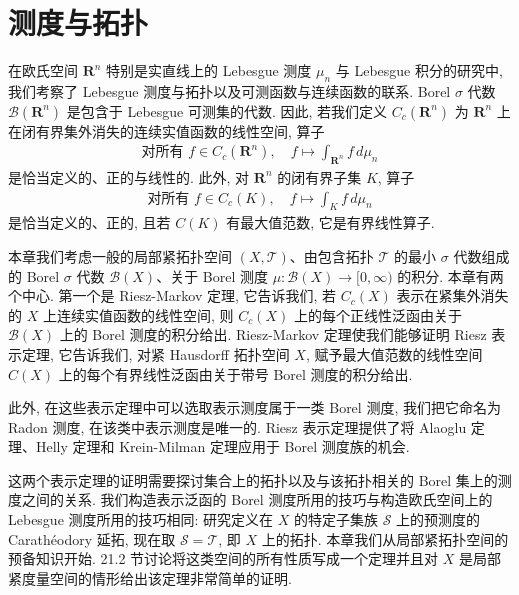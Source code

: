 \documentclass[../main.tex]{subfiles}
\begin{document}
\chapter{测度与拓扑}\label{chapter:ch21-测度与拓扑}

在欧氏空间 $\mathbf{R}^{n}$ 特别是实直线上的 Lebesgue 测度 $\mu_{n}$ 与 Lebesgue 积分的研究中, 我们考察了 Lebesgue 测度与拓扑以及可测函数与连续函数的联系. Borel $\sigma$ 代数 $\mathcal{B}(\mathbf{R}^{n})$ 是包含于 Lebesgue 可测集的代数. 因此, 若我们定义 $C_{c}(\mathbf{R}^{n})$ 为 $\mathbf{R}^{n}$ 上在闭有界集外消失的连续实值函数的线性空间, 算子
\begin{align*}
\text{对所有 }f\in C_{c}(\mathbf{R}^{n}),\quad f\mapsto\int_{\mathbf{R}^{n}}f\,d\mu_{n}
\end{align*}
是恰当定义的、正的与线性的. 此外, 对 $\mathbf{R}^{n}$ 的闭有界子集 $K$, 算子
\begin{align*}
\text{对所有 }f\in C_{c}(K),\quad f\mapsto\int_{K}f\,d\mu_{n}
\end{align*}
是恰当定义的、正的, 且若 $C(K)$ 有最大值范数, 它是有界线性算子.

本章我们考虑一般的局部紧拓扑空间 $(X,\mathcal{T})$、由包含拓扑 $\mathcal{T}$ 的最小 $\sigma$ 代数组成的 Borel $\sigma$ 代数 $\mathcal{B}(X)$、关于 Borel 测度 $\mu:\mathcal{B}(X)\to[0,\infty)$ 的积分. 本章有两个中心. 第一个是 Riesz-Markov 定理, 它告诉我们, 若 $C_{c}(X)$ 表示在紧集外消失的 $X$ 上连续实值函数的线性空间, 则 $C_{c}(X)$ 上的每个正线性泛函由关于 $\mathcal{B}(X)$ 上的 Borel 测度的积分给出. Riesz-Markov 定理使我们能够证明 Riesz 表示定理, 它告诉我们, 对紧 Hausdorff 拓扑空间 $X$, 赋予最大值范数的线性空间 $C(X)$ 上的每个有界线性泛函由关于带号 Borel 测度的积分给出.

此外, 在这些表示定理中可以选取表示测度属于一类 Borel 测度, 我们把它命名为 Radon 测度, 在该类中表示测度是唯一的. Riesz 表示定理提供了将 Alaoglu 定理、Helly 定理和 Krein-Milman 定理应用于 Borel 测度族的机会.

这两个表示定理的证明需要探讨集合上的拓扑以及与该拓扑相关的 Borel 集上的测度之间的关系. 我们构造表示泛函的 Borel 测度所用的技巧与构造欧氏空间上的 Lebesgue 测度所用的技巧相同: 研究定义在 $X$ 的特定子集族 $\mathcal{S}$ 上的预测度的 Carath\'eodory 延拓, 现在取 $\mathcal{S}=\mathcal{T}$, 即 $X$ 上的拓扑. 本章我们从局部紧拓扑空间的预备知识开始. 21.2 节讨论将这类空间的所有性质写成一个定理并且对 $X$ 是局部紧度量空间的情形给出该定理非常简单的证明.







\end{document}
